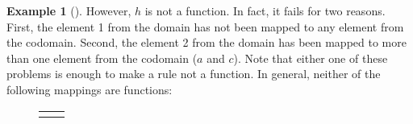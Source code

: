 \documentclass[10pt,]{book}
\theoremstyle{plain}
\theoremstyle{definition}
\newtheorem{example}[theorem]{Example}
\theoremstyle{definition}
\theoremstyle{definition}
\numberwithin{equation}{section}
\newlength{\panelmax}
\begin{document}
\begin{example}[]
          However, \(h\) is not a function. In fact, it fails for two reasons. First, the element 1 from the domain has not been mapped to any element from the codomain. Second, the element 2 from the domain has been mapped to more than one element from the codomain (\(a\) and \(c\)). Note that either one of these problems is enough to make a rule not a function. In general, neither of the following mappings are functions:
{%
\setlength{\panelmax}{0pt}
\newsavebox{\panelboxSimage}
\newlength{\phSimage}\setlength{\phSimage}{\ht\panelboxSimage+\dp\panelboxSimage}
\settototalheight{\phSimage}{\usebox{\panelboxSimage}}
\setlength{\panelmax}{\maxof{\panelmax}{\phSimage}}
\newsavebox{\panelboxTimage}
\newlength{\phTimage}\setlength{\phTimage}{\ht\panelboxTimage+\dp\panelboxTimage}
\settototalheight{\phTimage}{\usebox{\panelboxTimage}}
\setlength{\panelmax}{\maxof{\panelmax}{\phTimage}}
\leavevmode%
\setlength{\tabcolsep}{0.1375\textwidth}
\begin{figure}
\hspace*{0.1375\textwidth}%
\begin{tabular}{@{}*{2}{c}@{}}
\begin{minipage}[c][\panelmax][t]{0.18\textwidth}\usebox{\panelboxSimage}\end{minipage}&
\begin{minipage}[c][\panelmax][t]{0.27\textwidth}\usebox{\panelboxTimage}\end{minipage}\end{tabular}
\end{figure}
}%
\par


\end{example}
\end{document}
